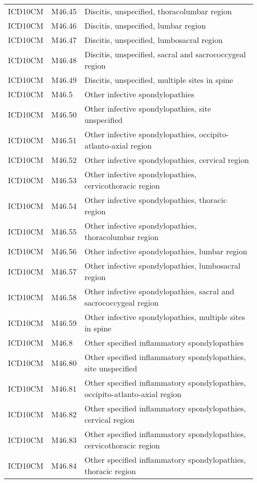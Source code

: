\begin{table}[ht]
\begin{tabular}{lll}
  ICD10CM & M46.45 & Discitis, unspecified, thoracolumbar region \\ 
  ICD10CM & M46.46 & Discitis, unspecified, lumbar region \\ 
  ICD10CM & M46.47 & Discitis, unspecified, lumbosacral region \\ 
  ICD10CM & M46.48 & Discitis, unspecified, sacral and sacrococcygeal region \\ 
  ICD10CM & M46.49 & Discitis, unspecified, multiple sites in spine \\ 
  ICD10CM & M46.5 & Other infective spondylopathies \\ 
  ICD10CM & M46.50 & Other infective spondylopathies, site unspecified \\ 
  ICD10CM & M46.51 & Other infective spondylopathies, occipito-atlanto-axial region \\ 
  ICD10CM & M46.52 & Other infective spondylopathies, cervical region \\ 
  ICD10CM & M46.53 & Other infective spondylopathies, cervicothoracic region \\ 
  ICD10CM & M46.54 & Other infective spondylopathies, thoracic region \\ 
  ICD10CM & M46.55 & Other infective spondylopathies, thoracolumbar region \\ 
  ICD10CM & M46.56 & Other infective spondylopathies, lumbar region \\ 
  ICD10CM & M46.57 & Other infective spondylopathies, lumbosacral region \\ 
  ICD10CM & M46.58 & Other infective spondylopathies, sacral and sacrococcygeal region \\ 
  ICD10CM & M46.59 & Other infective spondylopathies, multiple sites in spine \\ 
  ICD10CM & M46.8 & Other specified inflammatory spondylopathies \\ 
  ICD10CM & M46.80 & Other specified inflammatory spondylopathies, site unspecified \\ 
  ICD10CM & M46.81 & Other specified inflammatory spondylopathies, occipito-atlanto-axial region \\ 
  ICD10CM & M46.82 & Other specified inflammatory spondylopathies, cervical region \\ 
  ICD10CM & M46.83 & Other specified inflammatory spondylopathies, cervicothoracic region \\ 
  ICD10CM & M46.84 & Other specified inflammatory spondylopathies, thoracic region \\ 

\end{tabular}
\end{table}
